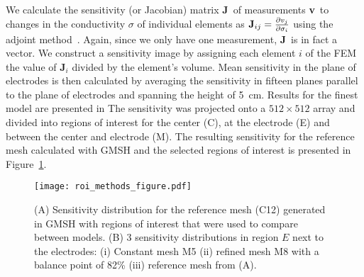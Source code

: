 \documentclass[12pt]{iopart}
\newcommand{\VB}{{\mbox{\bf V}}}
\newcommand{\JB}{{\mbox{\bf J}}}
\newcommand{\vB}{{\mbox{\bf v}}}
\begin{document}

We calculate the sensitivity (or Jacobian) matrix \JB\ of measurements \vB\ to
changes in the conductivity $\sigma$ of individual elements as
$\JB_{ij}=\frac{\partial v_j}{\partial \sigma_i}$ using the adjoint
method~\cite{Polydorides2002b}. Again, since we only have one measurement, \JB\
is in fact a vector.
We construct a sensitivity image by assigning each element
$i$ of the FEM the value of \JB$_i$ divided by the element's volume.
Mean sensitivity in the plane of electrodes is then calculated by averaging
the sensitivity in fifteen planes parallel to the plane of electrodes and
spanning the height of 5~cm. Results for the finest model are presented in 
The sensitivity was projected onto a $512\times512$ array and divided into regions
of interest for the center (C), at the electrode (E) and between the center and electrode
(M). The resulting sensitivity for the reference mesh calculated with GMSH and the 
selected regions of interest is presented in Figure~\ref{fig:roiMethods}.

\begin{figure}
  \texttt{[image: roi\_methods\_figure.pdf]}
  \caption{\label{fig:roiMethods} (A) Sensitivity distribution for the reference mesh
  (C12) generated in GMSH with regions of interest that were used to compare between models. 
  (B) 3 sensitivity distributions in region $E$ next to the electrodes: (i) Constant mesh M5
  (ii) refined mesh M8 with a balance point of 82\% (iii) reference mesh from (A).
  }
\end{figure}

\end{document}
